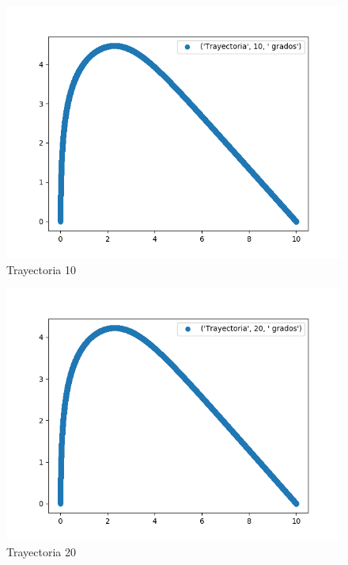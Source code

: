 \documentclass{article}
\begin{document}
\begin{figure}
  \centering
    \includegraphics{('Trayectoria', 10, ' grados').png}
  \caption{Trayectoria 10}
  \label{fig:ejemplo1}
\end{figure}
\begin{figure}
  \centering
    \includegraphics{('Trayectoria', 20, ' grados').png}
  \caption{Trayectoria 20}
  \label{fig:ejemplo1}
\end{figure}
\end{document}
